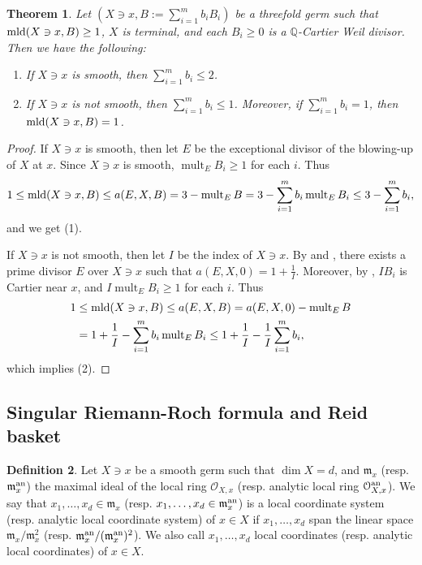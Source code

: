 \documentclass[11pt]{amsart}
\numberwithin{equation}{section}
\newcommand{\Qq}{\mathbb{Q}}
\newcommand{\mld}{{\rm{mld}}}
\newcommand{\mult}{\operatorname{mult}}
\newtheorem{thm}{Theorem}[section]
\theoremstyle{definition}
\theoremstyle{definition}
\newtheorem{defn}[thm]{Definition}
\begin{document}
\begin{thm}\label{thm: 3-dim terminal number of coefficients local}
Let $(X\ni x,B:=\sum_{i=1}^m b_iB_i)$ be a threefold germ such that $\mld(X\ni x,B)\geq 1$, $X$ is terminal, and each $B_i\geq 0$ is a $\Qq$-Cartier Weil divisor. Then we have the following:
\begin{enumerate}
    \item If $X\ni x$ is smooth, then $\sum_{i=1}^m b_i\leq 2$.
    \item If $X\ni x$ is not smooth, then $\sum_{i=1}^m b_i\le 1$. Moreover, if $\sum_{i=1}^m b_i=1$, then $\mld(X\ni x, B)=1$.
\end{enumerate}
\end{thm}
\begin{proof}
If $X\ni x$ is smooth, then let $E$ be the exceptional divisor of the blowing-up of $X$ at $x$. Since $X\ni x$ is smooth, $\mult_EB_i\geq 1$ for each $i$. Thus
$$1\leq \mld(X\ni x,B)\leq a(E,X,B)=3-\mult_EB=3-\sum_{i=1}^mb_i\mult_EB_i\leq 3-\sum_{i=1}^mb_i,$$
and we get (1).

If $X\ni x$ is not smooth, then let $I$ be the index of $X\ni x$. By \cite[Appendix, Theorem]{Sho92} and \cite[Theorem~0.1]{Mar96}, there exists a prime divisor $E$ over $X\ni x$ such that $a(E,X,0)=1+\frac{1}{I}$. Moreover, by \cite[Lemma~5.1]{Kaw88}, $IB_i$ is Cartier near $x$, and $I\mult_EB_i\geq 1$ for each $i$. Thus
\begin{align*}
    1&\leq\mld(X\ni x,B)\leq a(E,X,B)=a(E,X,0)-\mult_EB\\
    &=1+\frac{1}{I}-\sum_{i=1}^mb_i\mult_EB_i\leq 1+\frac{1}{I}-\frac{1}{I}\sum_{i=1}^mb_i,
\end{align*}
which implies (2).
\end{proof}



\subsection{Singular Riemann-Roch formula and Reid basket}\label{section: RR-formula}

\begin{defn}
Let $X\ni x$ be a smooth germ such that $\dim X=d$, and $\mathfrak{m}_x$ (resp. $\mathfrak{m}_x^{\rm an}$) the maximal ideal of the local ring $\mathcal{O}_{X,x}$ (resp. analytic local ring $\mathcal{O}_{X,x}^{\rm an}$). We say that $x_1,\dots,x_d\in \mathfrak{m}_x$ (resp. $x_1,\dots,x_d\in\mathfrak{m}_x^{\rm an}$) is a local coordinate system (resp. analytic local coordinate system) of $x\in X$ if $x_1,\dots,x_d$ span the linear space $\mathfrak{m}_x/\mathfrak{m}_x^2$ (resp. $\mathfrak{m}_x^{\rm an}/(\mathfrak{m}_x^{\rm an})^2$). We also call $x_1,\dots,x_d$ local coordinates (resp. analytic local coordinates) of $x\in X$.
\end{defn}
\end{document}
